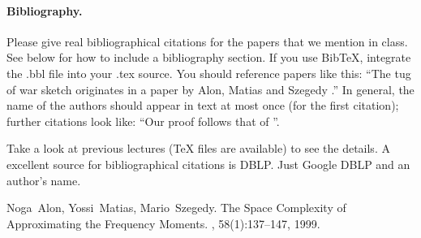 \documentclass[11pt]{article}
\begin{document}
\paragraph{Bibliography.}
Please give real bibliographical citations for the papers that we
mention in class. See below for how to include a bibliography section.
If you use BibTeX, integrate the .bbl file into your .tex source. You
should reference papers like this: ``The tug of war sketch originates
in a paper by Alon, Matias and Szegedy \cite{AMS99}.''  In general,
the name of the authors should appear in text at most once (for the
first citation); further citations look like: ``Our proof follows that
of \cite{AMS99}''.

Take a look at previous lectures (TeX files are available) to see the
details. A excellent source for bibliographical citations is
DBLP. Just Google DBLP and an author's name.





\begin{thebibliography}{42}

Noga~Alon, Yossi~Matias, Mario~Szegedy.
\newblock The Space Complexity of Approximating the Frequency Moments.
, 58(1):137--147, 1999.

\end{thebibliography}
\end{document}
